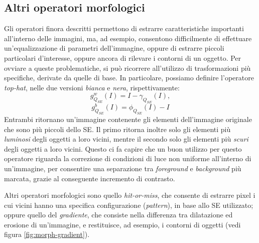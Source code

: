 \subsection{Altri operatori morfologici}
\label{subsec:math-morph-others}
Gli operatori finora descritti permettono di estrarre caratteristiche importanti all'interno delle immagini, ma, ad esempio, consentono difficilmente di effettuare un'equalizzazione di parametri dell'immagine, oppure di estrarre piccoli particolari d'interesse, oppure ancora di rilevare i contorni di un oggetto. Per ovviare a queste problematiche, si pu\`o ricorrere all'utilizzo di trasformazioni pi\`u specifiche, derivate da quelle di base. In particolare, possiamo definire l'operatore \textit{top-hat}, nelle due versioni \textit{bianca} e \textit{nera}, rispettivamente:
\begin{equation}
	\label{eq:white-top-hat}
	g_{Q_{SE}}^{w}(I) = I - \gamma_{Q_{SE}}(I),
\end{equation}
\begin{equation}
	\label{eq:black-top-hat}
	g_{Q_{SE}}^{b}(I) = \phi_{Q_{SE}}(I) - I
\end{equation}
Entrambi ritornano un'immagine contenente gli elementi dell'immagine originale che sono pi\`u piccoli dello SE. Il primo ritorna inoltre solo gli elementi pi\`u \textit{luminosi} degli oggetti a loro vicini, mentre il secondo solo gli elementi pi\`u \textit{scuri} degli oggetti a loro vicini. Questo ci fa capire che un buon utilizzo per questo operatore riguarda la correzione di condizioni di luce non uniforme all'interno di un'immagine, per consentire una separazione tra \textit{foreground} e \textit{background} pi\`u marcata, grazie al conseguente incremento di contrasto.
\par Altri operatori morfologici sono quello \textit{hit-or-miss}, che consente di estrarre pixel i cui vicini hanno una specifica configurazione (\textit{pattern}), in base allo SE utilizzato; oppure quello del \textit{gradiente}, che consiste nella differenza tra dilatazione ed erosione di un'immagine, e restituisce, ad esempio, i contorni di oggetti (vedi figura \ref{fig:morph-gradient}).

